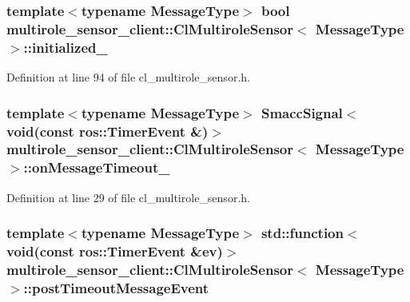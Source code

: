 \subsubsection[{\texorpdfstring{initialized\+\_\+}{initialized_}}]{\setlength{\rightskip}{0pt plus 5cm}template$<$typename Message\+Type$>$ {\bf bool} {\bf multirole\+\_\+sensor\+\_\+client\+::\+Cl\+Multirole\+Sensor}$<$ Message\+Type $>$\+::initialized\+\_\+\hspace{0.3cm}{\ttfamily [private]}}\hypertarget{classmultirole__sensor__client_1_1ClMultiroleSensor_a6e7db1927a389af715f541837ac78d99}{}\label{classmultirole__sensor__client_1_1ClMultiroleSensor_a6e7db1927a389af715f541837ac78d99}


Definition at line 94 of file cl\+\_\+multirole\+\_\+sensor.\+h.

\subsubsection[{\texorpdfstring{on\+Message\+Timeout\+\_\+}{onMessageTimeout_}}]{\setlength{\rightskip}{0pt plus 5cm}template$<$typename Message\+Type$>$ {\bf Smacc\+Signal}$<$void(const ros\+::\+Timer\+Event \&)$>$ {\bf multirole\+\_\+sensor\+\_\+client\+::\+Cl\+Multirole\+Sensor}$<$ Message\+Type $>$\+::on\+Message\+Timeout\+\_\+}\hypertarget{classmultirole__sensor__client_1_1ClMultiroleSensor_a1bc88382c36abae583a7c946cfe10ace}{}\label{classmultirole__sensor__client_1_1ClMultiroleSensor_a1bc88382c36abae583a7c946cfe10ace}


Definition at line 29 of file cl\+\_\+multirole\+\_\+sensor.\+h.

\subsubsection[{\texorpdfstring{post\+Timeout\+Message\+Event}{postTimeoutMessageEvent}}]{\setlength{\rightskip}{0pt plus 5cm}template$<$typename Message\+Type$>$ std\+::function$<$void(const ros\+::\+Timer\+Event \&ev)$>$ {\bf multirole\+\_\+sensor\+\_\+client\+::\+Cl\+Multirole\+Sensor}$<$ Message\+Type $>$\+::post\+Timeout\+Message\+Event}\hypertarget{classmultirole__sensor__client_1_1ClMultiroleSensor_a7453ad95c3b9bdffd4184e2d99cd0967}{}\label{classmultirole__sensor__client_1_1ClMultiroleSensor_a7453ad95c3b9bdffd4184e2d99cd0967}


